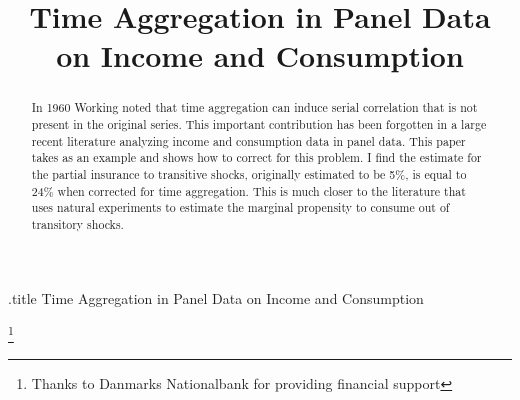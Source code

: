 \documentclass[titlepage]{\econtex}\newcommand{\texname}{BPP_TimeAgg}
\begin{document}




\begin{verbatimwrite}{\jobname.title}
Time Aggregation in Panel Data on Income and Consumption
\end{verbatimwrite}

\hfill{\tiny \jobname}

\title{Time Aggregation in Panel Data \\ on Income and Consumption}



\maketitle

\begin{abstract}
In 1960 Working noted that time aggregation can induce serial correlation that is not present in the original series. This important contribution has been forgotten in a large recent literature analyzing income and consumption data in panel data. This paper takes \cite{blundell_consumption_2008} as an example and shows how to correct for this problem. I find the estimate for the partial insurance to transitive shocks, originally estimated to be 5\%, is equal to 24\% when corrected for time aggregation. This is much closer to the literature that uses natural experiments to estimate the marginal propensity to consume out of transitory shocks.
%  
\end{abstract}


\begin{authorsinfo}
\end{authorsinfo}
\thanks{Thanks to Danmarks Nationalbank for providing financial support}
\end{document}
